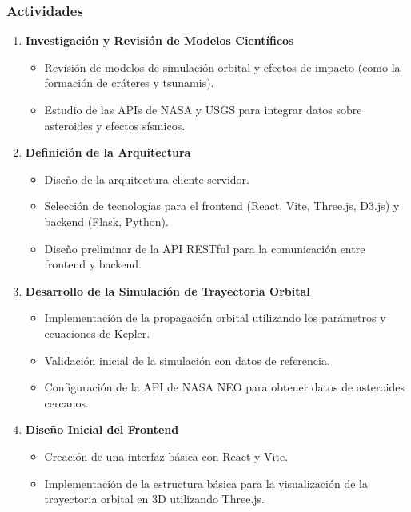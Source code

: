 \documentclass[conference]{IEEEtran}
\begin{document}
\subsubsection*{Actividades}
\begin{enumerate}
	\item \textbf{Investigación y Revisión de Modelos Científicos}
	      \begin{itemize}
		      \item Revisión de modelos de simulación orbital y efectos de impacto
		            (como la formación de cráteres y tsunamis).
		      \item Estudio de las APIs de NASA y USGS para integrar datos sobre
		            asteroides y efectos sísmicos.
	      \end{itemize}
	\item \textbf{Definición de la Arquitectura}
	      \begin{itemize}
		      \item Diseño de la arquitectura cliente-servidor.
		      \item Selección de tecnologías para el frontend (React, Vite,
		            Three.js, D3.js) y backend (Flask, Python).
		      \item Diseño preliminar de la API RESTful para la comunicación entre
		            frontend y backend.
	      \end{itemize}
	\item \textbf{Desarrollo de la Simulación de Trayectoria Orbital}
	      \begin{itemize}
		      \item Implementación de la propagación orbital utilizando los parámetros y
		            ecuaciones de Kepler.
		      \item Validación inicial de la simulación con datos de referencia.
		      \item Configuración de la API de NASA NEO para obtener datos de asteroides cercanos.
	      \end{itemize}
	\item \textbf{Diseño Inicial del Frontend}
	      \begin{itemize}
		      \item Creación de una interfaz básica con React y Vite.
		      \item Implementación de la estructura básica para la visualización
		            de la trayectoria orbital en 3D utilizando Three.js.

	      \end{itemize}
\end{enumerate}
\end{document}
